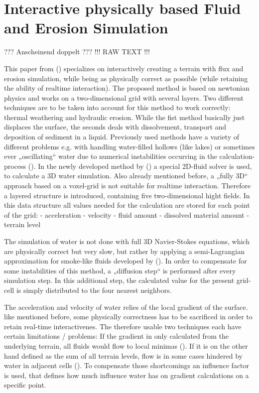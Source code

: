 \section{Interactive physically based Fluid and Erosion Simulation}

??? Anscheinend doppelt ???
!!! RAW TEXT !!!

This paper from () specializes on interactively creating a terrain with flux and erosion simulation, while being as physically correct as possible (while retaining the ability of realtime interaction). The proposed method is based on newtonian physics and works on a two-dimensional grid with several layers.
Two different techniques are to be taken into account for this method to work correctly: thermal weathering and hydraulic erosion. While the fist method basically just displaces the surface, the seconds deals with dissolvement, transport and deposition of sediment in a liquid. Previously used methods have a variety of different problems e.g. with handling water-filled hollows (like lakes) or sometimes ever „oscillating“ water due to numerical instabilities occurring in the calculation-process ().
In the newly developed method by () a special 2D-fluid solver is used, to calculate a 3D water simulation. Also already mentioned before, a „fully 3D“ approach based on a voxel-grid is not suitable for realtime interaction. Therefore a layered structure is introduced, containing five two-dimensional hight fields. In this data structure all values needed for the calculation are stored for each point of the grid:
- acceleration
- velocity
- fluid amount
- dissolved material amount
- terrain level

The simulation of water is not done with full 3D Navier-Stokes equations, which are physically correct but very slow, but rather by applying a semi-Lagrangian approximation for smoke-like fluids developed by (). In order to compensate for some instabilities of this method, a „diffusion step“ is performed after every simulation step. In this additional step, the calculated value for the present grid-cell is simply distributed to the four nearest neighbors.

The acceleration and velocity of water relies of the local gradient of the surface. like mentioned before, some physically correctness has to be sacrificed in order to retain real-time interactivenes. The therefore usable two techniques each have certain limitations / problems:
If the gradient in only calculated from the underlying terrain, all fluids would flow to local minimas (). If it is on the other hand defined as the sum of all terrain levels, flow is in some cases hindered by water in adjacent cells (). To compensate those shortcomings an influence factor is used, that defines how much influence water has on gradient calculations on a specific point.


